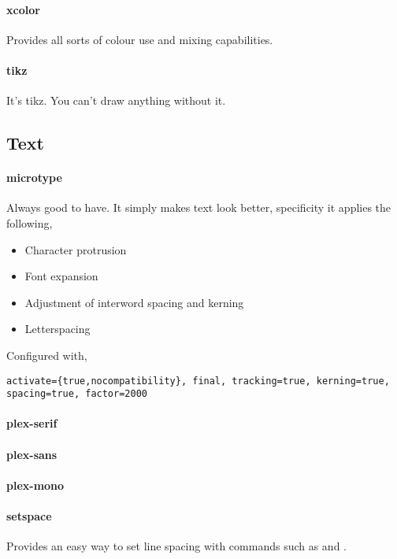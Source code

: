 \documentclass[solid,math,chem,code,plot,gloss]{bmc}
\begin{document}
\paragraph{\ttfamily xcolor}\label{par:xcolor}
Provides all sorts of colour use and mixing capabilities.
\paragraph{\ttfamily tikz}\label{par:tikz}
It's tikz. You can't draw anything without it.

\subsection{Text}

\paragraph{\ttfamily microtype}\label{par:microtype}
Always good to have. It simply makes text look better, specificity it applies the following,
\begin{itemize}
    \item Character protrusion
    \item Font expansion
    \item Adjustment of interword spacing and kerning
    \item Letterspacing
\end{itemize}
Configured with,
\begin{verbatim}
activate={true,nocompatibility}, final, tracking=true, kerning=true, spacing=true, factor=2000
\end{verbatim}
\paragraph{\ttfamily plex-serif}\label{par:plex-serif}
\paragraph{\ttfamily plex-sans}\label{par:plex-sans}
\paragraph{\ttfamily plex-mono}\label{par:plex-mono}
\paragraph{\ttfamily setspace}\label{par:setspace}
Provides an easy way to set line spacing with commands such as
\texttt{\doublespacing} and \texttt{}.
\end{document}
